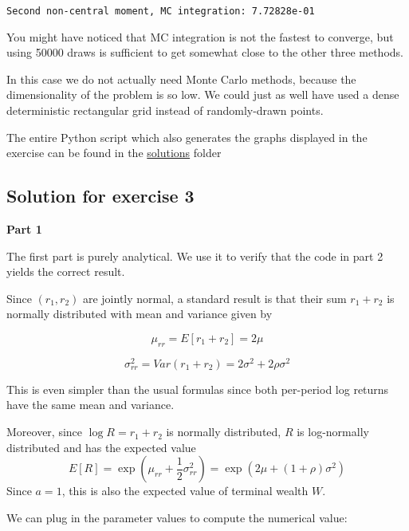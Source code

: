 \documentclass[10pt]{scrartcl}
\begin{document}
    \begin{Verbatim}[commandchars=\\\{\}]
Second non-central moment, MC integration: 7.72828e-01
    \end{Verbatim}

    You might have noticed that MC integration is not the fastest to
converge, but using 50000 draws is sufficient to get somewhat close to
the other three methods.

In this case we do not actually need Monte Carlo methods, because the
dimensionality of the problem is so low. We could just as well have used
a dense deterministic rectangular grid instead of randomly-drawn points.

The entire Python script which also generates the graphs displayed in
the exercise can be found in the
\href{../lectures/solutions/unit7}{solutions} folder

    \hypertarget{solution-for-exercise-3}{%
\subsection{Solution for exercise 3}\label{solution-for-exercise-3}}

\textbf{Part 1}

The first part is purely analytical. We use it to verify that the code
in part 2 yields the correct result.

Since \((r_1, r_2)\) are jointly normal, a standard result is that their
sum \(r_1 + r_2\) is normally distributed with mean and variance given
by

\[\mu_{rr} = E[r_1 + r_2] = 2\mu \]

\[\sigma^2_{rr} = Var(r_1+r_2) = 2\sigma^2 + 2\rho\sigma^2 \]

This is even simpler than the usual formulas since both per-period log
returns have the same mean and variance.

Moreover, since \(\log R = r_1 + r_2\) is normally distributed, \(R\) is
log-normally distributed and has the expected value \[
E[R] = \exp\left(\mu_{rr} + \frac{1}{2}\sigma_{rr}^2 \right)
    = \exp\left(2\mu + (1+\rho) \sigma^2 \right)
\] Since \(a = 1\), this is also the expected value of terminal wealth
\(W\).

We can plug in the parameter values to compute the numerical value:
\end{document}
